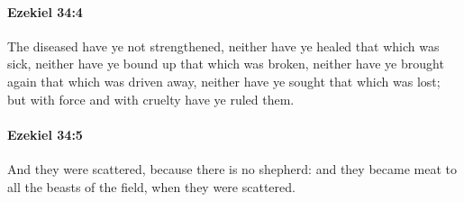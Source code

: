 		\paragraph{Ezekiel 34:4} %
			\label{EZEKIEL-34-4}

			The diseased have ye not strengthened, neither have ye healed that which was sick, neither have ye bound up that which was broken, neither have ye brought again that which was driven away, neither have ye sought that which was lost; but with force and with cruelty have ye ruled them.


		\paragraph{Ezekiel 34:5} %
			\label{EZEKIEL-34-5}

			And they were scattered, because there is no shepherd: and they became meat to all the beasts of the field, when they were scattered.


